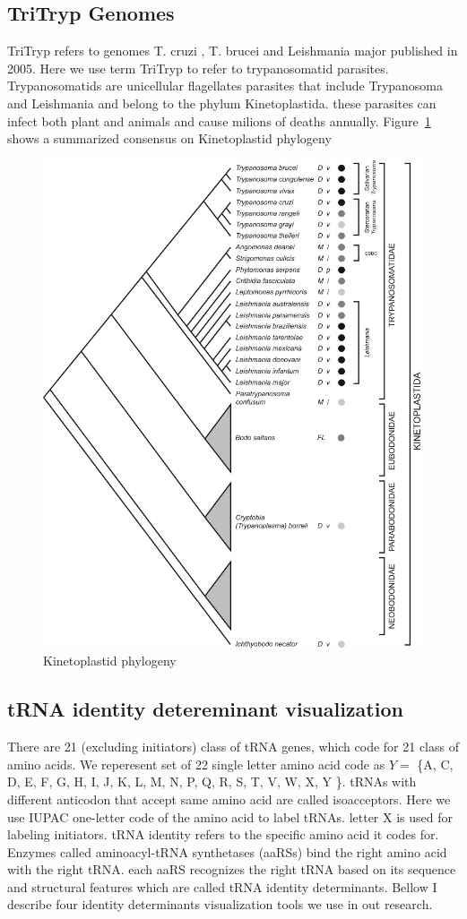 \documentclass[
10pt, %
a4paper, %
oneside, %
headinclude,footinclude, %
BCOR5mm, %
]{scrartcl}
\begin{document}
\subsection{\textbf{TriTryp Genomes}}
TriTryp refers to genomes T. cruzi \cite{El-Sayed409} , T. brucei \cite{Berriman416} and Leishmania major \cite{Ivens436} published in 2005. Here we use term TriTryp to refer to trypanosomatid parasites. Trypanosomatids are unicellular flagellates parasites that include Trypanosoma and Leishmania and belong to the phylum Kinetoplastida. these parasites can infect both plant and animals and cause milions of deaths annually. Figure~\ref{fig:Kinetoplastid} shows a summarized consensus on Kinetoplastid phylogeny\cite{jackson_2015}

\begin{figure}[H]
\centering 
\includegraphics[width=0.7\columnwidth]{Kinetoplastida.jpg} 
\caption[Kinetoplastid phylogeny]{Kinetoplastid phylogeny}
\label{fig:Kinetoplastid} 
\end{figure}

\subsection{\textbf{tRNA identity detereminant visualization}}
There are 21 (excluding initiators) class of tRNA genes, which code for 21 class of amino acids. We reperesent set of 22 single letter amino acid code as $Y =$ \{A, C, D, E, F, G, H, I, J, K, L, M, N, P, Q, R, S, T, V, W, X, Y \}. tRNAs with different anticodon that accept same amino acid are called isoacceptors. Here we use IUPAC one-letter code of the amino acid to label tRNAs. letter X is used for labeling initiators. tRNA identity refers to the specific amino acid it codes for. Enzymes called aminoacyl-tRNA synthetases (aaRSs) bind the right amino acid with the right tRNA. each aaRS recognizes the right tRNA based on its sequence and structural features which are called tRNA identity determinants. Bellow I describe four identity determinants visualization tools we use in out research. 
\end{document}
